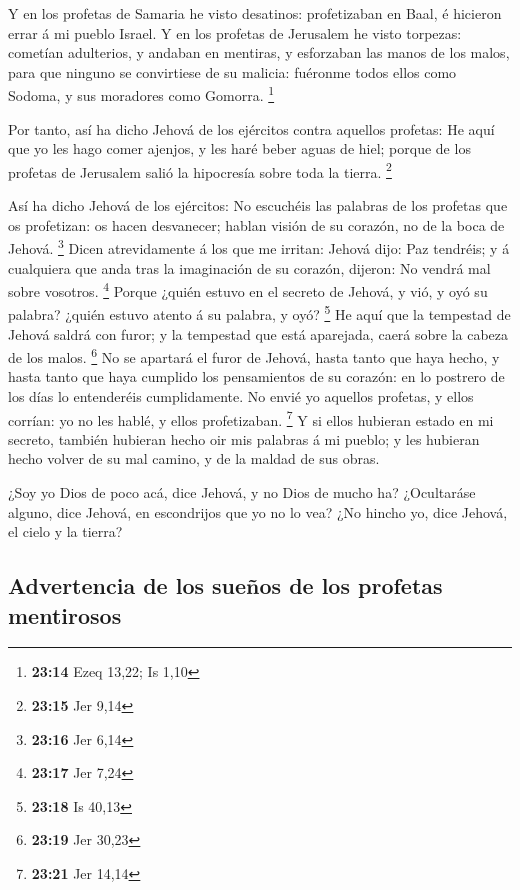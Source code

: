  Y en los profetas de Samaria he visto desatinos:
profetizaban en Baal, é hicieron errar á mi pueblo Israel. 
Y en los profetas de Jerusalem he visto torpezas: cometían adulterios, y
andaban en mentiras, y esforzaban las manos de los malos, para que
ninguno se convirtiese de su malicia: fuéronme todos ellos como Sodoma,
y sus moradores como Gomorra. \footnote{\textbf{23:14} Ezeq 13,22; Is
  1,10}

 Por tanto, así ha dicho Jehová de los ejércitos contra
aquellos profetas: He aquí que yo les hago comer ajenjos, y les haré
beber aguas de hiel; porque de los profetas de Jerusalem salió la
hipocresía sobre toda la tierra. \footnote{\textbf{23:15} Jer 9,14}

 Así ha dicho Jehová de los ejércitos: No escuchéis las
palabras de los profetas que os profetizan: os hacen desvanecer; hablan
visión de su corazón, no de la boca de Jehová. \footnote{\textbf{23:16}
  Jer 6,14}  Dicen atrevidamente á los que me irritan:
Jehová dijo: Paz tendréis; y á cualquiera que anda tras la imaginación
de su corazón, dijeron: No vendrá mal sobre vosotros. \footnote{\textbf{23:17}
  Jer 7,24}  Porque ¿quién estuvo en el secreto de Jehová,
y vió, y oyó su palabra? ¿quién estuvo atento á su palabra, y oyó?
\footnote{\textbf{23:18} Is 40,13}  He aquí que la
tempestad de Jehová saldrá con furor; y la tempestad que está aparejada,
caerá sobre la cabeza de los malos. \footnote{\textbf{23:19} Jer 30,23}
 No se apartará el furor de Jehová, hasta tanto que haya
hecho, y hasta tanto que haya cumplido los pensamientos de su corazón:
en lo postrero de los días lo entenderéis cumplidamente. 
No envié yo aquellos profetas, y ellos corrían: yo no les hablé, y ellos
profetizaban. \footnote{\textbf{23:21} Jer 14,14}  Y si
ellos hubieran estado en mi secreto, también hubieran hecho oir mis
palabras á mi pueblo; y les hubieran hecho volver de su mal camino, y de
la maldad de sus obras.

 ¿Soy yo Dios de poco acá, dice Jehová, y no Dios de mucho
ha?  ¿Ocultaráse alguno, dice Jehová, en escondrijos que yo
no lo vea? ¿No hincho yo, dice Jehová, el cielo y la tierra?

\hypertarget{advertencia-de-los-sueuxf1os-de-los-profetas-mentirosos}{%
\subsection{Advertencia de los sueños de los profetas
mentirosos}\label{advertencia-de-los-sueuxf1os-de-los-profetas-mentirosos}}

